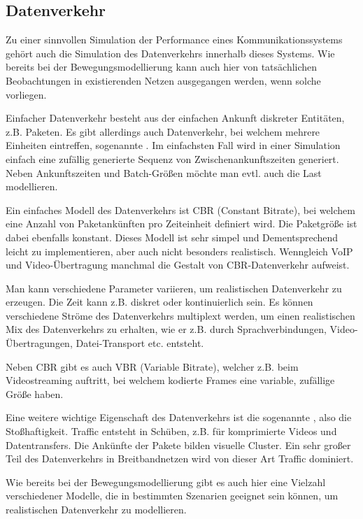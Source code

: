 \documentclass[12pt, a4paper]{article}
\begin{document}
\pagebreak

\subsection{Datenverkehr}
\label{sec:traffic}

Zu einer sinnvollen Simulation der Performance eines Kommunikationssystems gehört auch die Simulation des Datenverkehrs
innerhalb dieses Systems. Wie bereits bei der Bewegungsmodellierung kann auch hier von tatsächlichen Beobachtungen in
existierenden Netzen ausgegangen werden, wenn solche vorliegen.

Einfacher Datenverkehr besteht aus der einfachen Ankunft diskreter Entitäten, z.B. Paketen.
Es gibt allerdings auch Datenverkehr, bei welchem mehrere Einheiten eintreffen, sogenannte .
Im einfachsten Fall wird in einer Simulation einfach eine zufällig generierte Sequenz von Zwischenankunftszeiten generiert.
Neben Ankunftszeiten und Batch-Größen möchte man evtl. auch die Last modellieren.

Ein einfaches Modell des Datenverkehrs ist \textsc{CBR} (Constant Bitrate), bei welchem eine Anzahl von Paketankünften
pro Zeiteinheit definiert wird. Die Paketgröße ist dabei ebenfalls konstant. Dieses Modell ist sehr simpel und Dementsprechend
leicht zu implementieren, aber auch nicht besonders realistisch. Wenngleich VoIP und Video-Übertragung manchmal
die Gestalt von \textsc{CBR}-Datenverkehr aufweist.

Man kann verschiedene Parameter variieren, um realistischen Datenverkehr zu erzeugen. Die Zeit kann z.B. diskret oder
kontinuierlich sein. Es können verschiedene Ströme des Datenverkehrs multiplext werden, um einen realistischen Mix
des Datenverkehrs zu erhalten, wie er z.B. durch Sprachverbindungen, Video-Übertragungen, Datei-Transport etc. entsteht.

Neben \textsc{CBR} gibt es auch \textsc{VBR} (Variable Bitrate), welcher z.B. beim Videostreaming auftritt,
bei welchem kodierte Frames eine variable, zufällige Größe haben.

Eine weitere wichtige Eigenschaft des Datenverkehrs ist die sogenannte , also die Stoßhaftigkeit.
Traffic entsteht in Schüben, z.B. für komprimierte Videos und Datentransfers. Die Ankünfte der Pakete bilden visuelle
Cluster. Ein sehr großer Teil des Datenverkehrs in Breitbandnetzen wird von dieser Art Traffic dominiert.

Wie bereits bei der Bewegungsmodellierung gibt es auch hier eine Vielzahl verschiedener Modelle, die in bestimmten Szenarien
geeignet sein können, um realistischen Datenverkehr zu modellieren.
\end{document}
